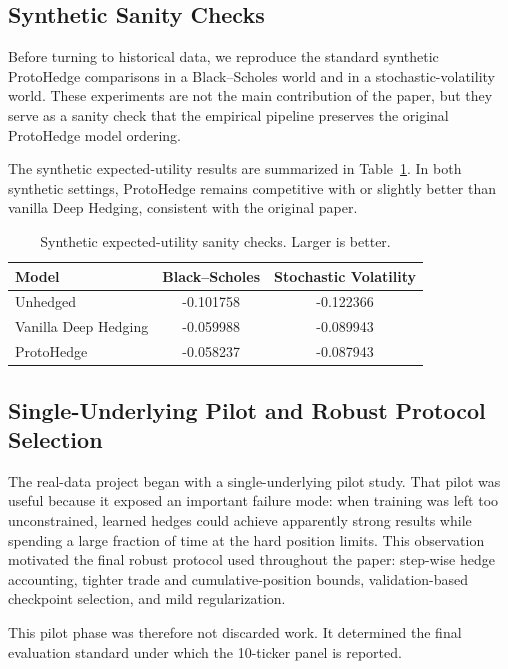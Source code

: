 \documentclass[11pt]{article}
\begin{document}
\subsection{Synthetic Sanity Checks}
Before turning to historical data, we reproduce the standard synthetic ProtoHedge comparisons in a Black--Scholes world and in a stochastic-volatility world. These experiments are not the main contribution of the paper, but they serve as a sanity check that the empirical pipeline preserves the original ProtoHedge model ordering.

The synthetic expected-utility results are summarized in Table~\ref{tab:synthetic-utility}. In both synthetic settings, ProtoHedge remains competitive with or slightly better than vanilla Deep Hedging, consistent with the original paper.

\begin{table}[H]
\centering
\caption{Synthetic expected-utility sanity checks. Larger is better.}
\label{tab:synthetic-utility}
\begin{tabular}{lcc}
\toprule
Model & Black--Scholes & Stochastic Volatility \\
\midrule
Unhedged & -0.101758 & -0.122366 \\
Vanilla Deep Hedging & -0.059988 & -0.089943 \\
ProtoHedge & -0.058237 & -0.087943 \\
\bottomrule
\end{tabular}
\end{table}

\subsection{Single-Underlying Pilot and Robust Protocol Selection}
The real-data project began with a single-underlying pilot study. That pilot was useful because it exposed an important failure mode: when training was left too unconstrained, learned hedges could achieve apparently strong results while spending a large fraction of time at the hard position limits. This observation motivated the final robust protocol used throughout the paper: step-wise hedge accounting, tighter trade and cumulative-position bounds, validation-based checkpoint selection, and mild regularization.

This pilot phase was therefore not discarded work. It determined the final evaluation standard under which the 10-ticker panel is reported.
\end{document}
